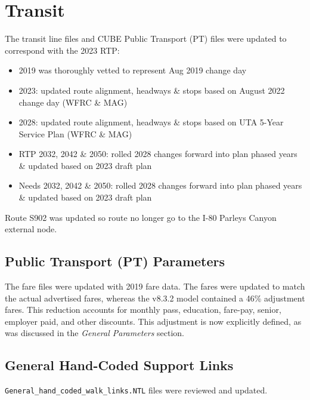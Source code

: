 \documentclass[
  letterpaper,
  DIV=11,
  numbers=noendperiod]{scrreprt}
\providecommand{\tightlist}{%
  \setlength{\itemsep}{0pt}\setlength{\parskip}{0pt}}\usepackage{longtable,booktabs,array}
\begin{document}
\hypertarget{transit}{%
\section{Transit}\label{transit}}

The transit line files and CUBE Public Transport (PT) files were updated
to correspond with the 2023 RTP:

\begin{itemize}
\tightlist
\item
  2019 was thoroughly vetted to represent Aug 2019 change day
\item
  2023: updated route alignment, headways \& stops based on August 2022
  change day (WFRC \& MAG)
\item
  2028: updated route alignment, headways \& stops based on UTA 5-Year
  Service Plan (WFRC \& MAG)
\item
  RTP 2032, 2042 \& 2050: rolled 2028 changes forward into plan phased
  years \& updated based on 2023 draft plan
\item
  Needs 2032, 2042 \& 2050: rolled 2028 changes forward into plan phased
  years \& updated based on 2023 draft plan
\end{itemize}

Route S902 was updated so route no longer go to the I-80 Parleys Canyon
external node.

\hypertarget{public-transport-pt-parameters}{%
\subsection{Public Transport (PT)
Parameters}\label{public-transport-pt-parameters}}

The fare files were updated with 2019 fare data. The fares were updated
to match the actual advertised fares, whereas the v8.3.2 model contained
a 46\% adjustment fares. This reduction accounts for monthly pass,
education, fare-pay, senior, employer paid, and other discounts. This
adjustment is now explicitly defined, as was discussed in the
\emph{General Parameters} section.

\hypertarget{general-hand-coded-support-links}{%
\subsection{General Hand-Coded Support
Links}\label{general-hand-coded-support-links}}

\texttt{General\_hand\_coded\_walk\_links.NTL} files were reviewed and
updated.
\end{document}
